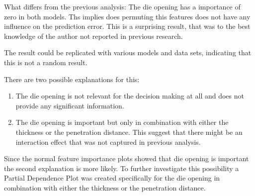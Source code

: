 What differs from the previous analysis: The die opening has a importance of zero in both models.
Ths implies does permuting this features does not have any influence on the prediction error.
This is a surprising result, that was to the best knowledge of the author not reported in previous research.

The result could be replicated with various models and data sets, indicating that this is not a random result.

There are two possible explanations for this:
\begin{enumerate}
    \item The die opening is not relevant for the decision making at all and does not provide any
    significant information.
    \item The die opening is important but only in combination with either the thickness or the
    penetration distance.
    This suggest that there might be an interaction effect that was not captured in previous analysis.
\end{enumerate}

Since the normal feature importance plots showed that die opening is important the second explanation is more
likely.
To further investigate this possibility a Partial Dependence Plot was created specifically for the die opening in
combination with either the thickness or the penetration distance.

